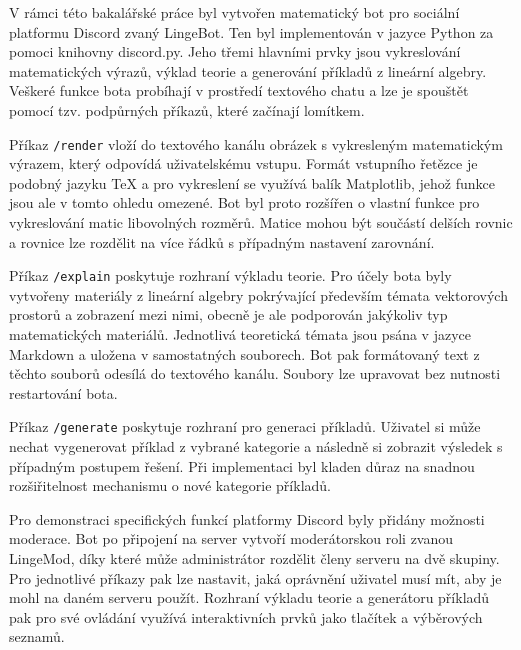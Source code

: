 \documentclass[FM]{tulthesis}
\begin{document}
	
	
	
	V rámci této bakalářské práce byl vytvořen matematický bot pro sociální platformu Discord zvaný LingeBot. Ten byl implementován v jazyce Python za pomoci knihovny discord.py. Jeho třemi hlavními prvky jsou vykreslování matematických výrazů, výklad teorie a generování příkladů z lineární algebry. Veškeré funkce bota probíhají v prostředí textového chatu a lze je spouštět pomocí tzv. podpůrných příkazů, které začínají lomítkem.
	
	Příkaz \verb|/render| vloží do textového kanálu obrázek s vykresleným matematickým výrazem, který odpovídá uživatelskému vstupu. Formát vstupního řetězce je podobný jazyku TeX a pro vykreslení se využívá balík Matplotlib, jehož funkce jsou ale v tomto ohledu omezené. Bot byl proto rozšířen o vlastní funkce pro vykreslování matic libovolných rozměrů. Matice mohou být součástí delších rovnic a rovnice lze rozdělit na více řádků s případným nastavení zarovnání.
	
	Příkaz \verb|/explain| poskytuje rozhraní výkladu teorie. Pro účely bota byly vytvořeny materiály z lineární algebry pokrývající především témata vektorových prostorů a zobrazení mezi nimi, obecně je ale podporován jakýkoliv typ matematických materiálů. Jednotlivá teoretická témata jsou psána v jazyce Markdown a uložena v samostatných souborech. Bot pak formátovaný text z těchto souborů odesílá do textového kanálu. Soubory lze upravovat bez nutnosti restartování bota. %
	
	Příkaz \verb|/generate| poskytuje rozhraní pro generaci příkladů. Uživatel si může nechat vygenerovat příklad z vybrané kategorie a následně si zobrazit výsledek s případným postupem řešení. Při implementaci byl kladen důraz na snadnou rozšiřitelnost mechanismu o nové kategorie příkladů.
	
	Pro demonstraci specifických funkcí platformy Discord byly přidány možnosti moderace. Bot po připojení na server vytvoří moderátorskou roli zvanou LingeMod, díky které může administrátor rozdělit členy serveru na dvě skupiny. Pro jednotlivé příkazy pak lze nastavit, jaká oprávnění uživatel musí mít, aby je mohl na daném serveru použít. Rozhraní výkladu teorie a generátoru příkladů pak pro své ovládání využívá interaktivních prvků jako tlačítek a výběrových seznamů.
	
\end{document}
